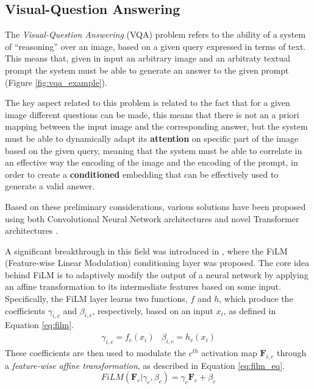 \subsection{Visual-Question Answering}
\label{sec:vqa}
The \textit{Visual-Question Answering} (VQA) problem refers to the ability of a system of ``reasoning'' over an image, based on a given query expressed in terms of text. This means that, given in input an arbitrary image and an arbitraty textual prompt the system must be able to generate an answer to the given prompt (Figure \ref{fig:vqa_example}).


The key aspect related to this problem is related to the fact that for a given image different questions can be made, this means that there is not an a priori mapping between the input image and the corresponding answer, but the system must be able to dynamically adapt its \textbf{attention} on specific part of the image based on the given query, meaning that the system must be able to correlate in an effective way the encoding of the image and the encoding of the prompt, in order to create a \textbf{conditioned} embedding that can be effectively used to generate a valid answer.

Based on these preliminary considerations, various solutions have been proposed using both Convolutional Neural Network architectures \cite{perez2018film} and novel Transformer architectures \cite{chen2022caan,chen2024mpcct,liu2024visual}.

A significant breakthrough in this field was introduced in \cite{perez2018film}, where the FiLM (Feature-wise Linear Modulation) conditioning layer was proposed. The core idea behind FiLM is to adaptively modify the output of a neural network by applying an affine transformation to its intermediate features based on some input. Specifically, the FiLM layer learns two functions, $f$ and $h$, which produce the coefficients $\gamma_{i,c}$ and $\beta_{i,c}$, respectively, based on an input $x_{i}$, as defined in Equation \ref{eq:film}.
\begin{equation}
    \label{eq:film}
    \begin{matrix}
        \gamma_{i,c} = f_{c}(x_{i}) & 
        \beta_{i,c} = h_{c}(x_{i})
    \end{matrix}
\end{equation}
These coefficients are then used to modulate the $c^{th}$ activation map $\textbf{F}_{i,c}$ through a \textit{feature-wise affine transformation}, as described in Equation \ref{eq:film_eq}.
\begin{equation}
    \label{eq:film_eq}
    FiLM(\textbf{F}_{c}|\gamma_{c}, \beta_{c}) = \gamma_{c} \textbf{F}_{c} + \beta_{c}
\end{equation}

